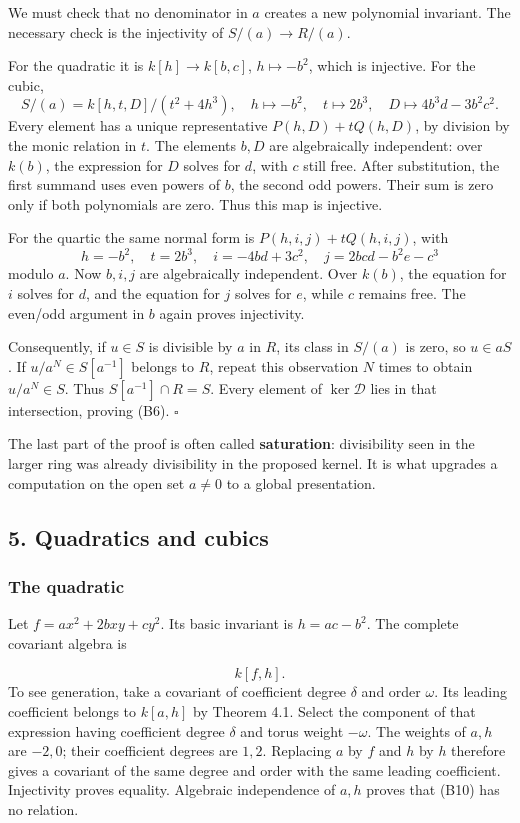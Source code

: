 \documentclass[
]{article}
\begin{document}
We must check that no denominator in \(a\) creates a new polynomial
invariant. The necessary check is the injectivity of \(S/(a)\to R/(a)\).

For the quadratic it is \(k [h]\to k [b,c]\), \(h\mapsto-b^2\), which is
injective. For the cubic, \[
S/(a)=k [h,t,D]/(t^2+4h^3),
\quad h\mapsto-b^2,\quad t\mapsto2b^3,
\quad D\mapsto4b^3d-3b^2c^2.
\] Every element has a unique representative \(P(h,D)+tQ(h,D)\), by
division by the monic relation in \(t\). The elements \(b,D\) are
algebraically independent: over \(k(b)\), the expression for \(D\)
solves for \(d\), with \(c\) still free. After substitution, the first
summand uses even powers of \(b\), the second odd powers. Their sum is
zero only if both polynomials are zero. Thus this map is injective.

For the quartic the same normal form is \(P(h,i,j)+tQ(h,i,j)\), with \[
h=-b^2,\quad t=2b^3,\quad
i=-4bd+3c^2,\quad j=2bcd-b^2e-c^3
\] modulo \(a\). Now \(b,i,j\) are algebraically independent. Over
\(k(b)\), the equation for \(i\) solves for \(d\), and the equation for
\(j\) solves for \(e\), while \(c\) remains free. The even/odd argument
in \(b\) again proves injectivity.

Consequently, if \(u\in S\) is divisible by \(a\) in \(R\), its class in
\(S/(a)\) is zero, so \(u\in aS\). If \(u/a^N\in S [a^{-1}]\) belongs to
\(R\), repeat this observation \(N\) times to obtain \(u/a^N\in S\).
Thus \(S [a^{-1}]\cap R=S\). Every element of \(\ker\mathcal D\) lies in
that intersection, proving (B6). \(\square\)

The last part of the proof is often called \textbf{saturation}:
divisibility seen in the larger ring was already divisibility in the
proposed kernel. It is what upgrades a computation on the open set
\(a\ne0\) to a global presentation.

\subsection{5. Quadratics and cubics}\label{section-5}

\subsubsection{The quadratic}\label{the-quadratic}

Let \(f=ax^2+2bxy+cy^2\). Its basic invariant is \(h=ac-b^2\). The
complete covariant algebra is
\protect{}\label{equation-B10}{}

\[
k [f,h].
\tag{B10}
\] To see generation, take a covariant of coefficient degree \(\delta\)
and order \(\omega\). Its leading coefficient belongs to \(k [a,h]\) by
Theorem 4.1. Select the component of that expression having coefficient
degree \(\delta\) and torus weight \(-\omega\). The weights of \(a,h\)
are \(-2,0\); their coefficient degrees are \(1,2\). Replacing \(a\) by
\(f\) and \(h\) by \(h\) therefore gives a covariant of the same degree
and order with the same leading coefficient. Injectivity proves
equality. Algebraic independence of \(a,h\) proves that (B10) has no
relation.
\end{document}
